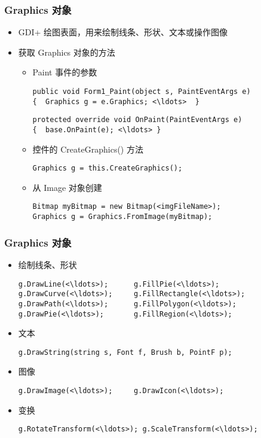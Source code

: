 \begin{frame}[fragile]
\frametitle{Graphics 对象}
\begin{itemize}
\item GDI+ 绘图表面，用来绘制线条、形状、文本或操作图像
\item 获取 Graphics 对象的方法
\begin{itemize}
\item Paint 事件的参数
\begin{lstlisting}[escapeinside=<>]
public void Form1_Paint(object s, PaintEventArgs e) 
{  Graphics g = e.Graphics; <\ldots>  }
\end{lstlisting}
\begin{lstlisting}[escapeinside=<>]
protected override void OnPaint(PaintEventArgs e)
{  base.OnPaint(e); <\ldots> }
\end{lstlisting}
\item 控件的 CreateGraphics() 方法
\begin{lstlisting}
Graphics g = this.CreateGraphics();
\end{lstlisting}
\item 从 Image 对象创建
\begin{lstlisting}[escapeinside=<>]
Bitmap myBitmap = new Bitmap(<imgFileName>);
Graphics g = Graphics.FromImage(myBitmap);
\end{lstlisting}
\end{itemize}
\end{itemize}
\end{frame}


\begin{frame}[fragile]
\frametitle{Graphics 对象}
\begin{itemize}
\item 绘制线条、形状
\begin{lstlisting}[escapeinside=<>]
g.DrawLine(<\ldots>);      g.FillPie(<\ldots>);
g.DrawCurve(<\ldots>);     g.FillRectangle(<\ldots>);
g.DrawPath(<\ldots>);      g.FillPolygon(<\ldots>);
g.DrawPie(<\ldots>);       g.FillRegion(<\ldots>);
\end{lstlisting}
\item 文本
\begin{lstlisting}
g.DrawString(string s, Font f, Brush b, PointF p);
\end{lstlisting}
\item 图像
\begin{lstlisting}[escapeinside=<>]
g.DrawImage(<\ldots>);     g.DrawIcon(<\ldots>);
\end{lstlisting}
\item 变换
\begin{lstlisting}[escapeinside=<>]
g.RotateTransform(<\ldots>); g.ScaleTransform(<\ldots>);
\end{lstlisting}
\end{itemize}
\end{frame}

